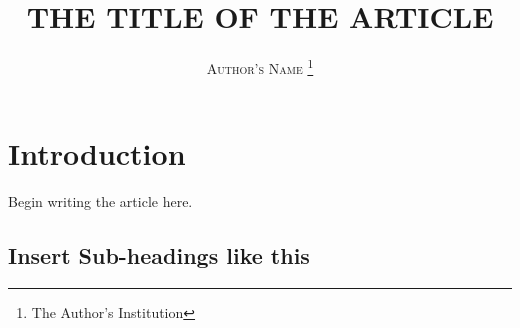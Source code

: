 \documentclass[a4paper,twoside,12pt]{article}
\title{\uppercase{\large{\textbf{The Title of the Article}}}} %
\date{} %
\author{%
\textsc{Author's Name}
\thanks{The Author's Institution} 
\\[1ex] 
}
\begin{document}
\maketitle

\section{Introduction}

Begin writing the article here.

\subsection{Insert Sub-headings like this}
\end{document}
